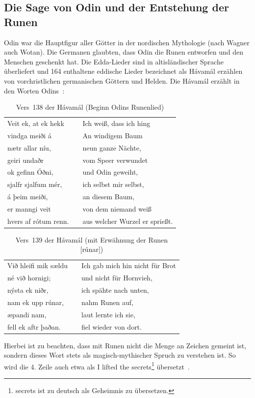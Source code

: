 \documentclass[a4paper]{scrartcl}
\begin{document}
\subsection{Die Sage von Odin und der Entstehung der Runen}
%
Odin war die Hauptfigur aller Götter in der nordischen Mythologie (nach Wagner auch \glqq Wotan\grqq). Die Germanen glaubten, dass Odin die Runen entworfen und den Menschen geschenkt hat. Die Edda-Lieder sind in altisländischer Sprache überliefert und 164 enthaltene eddische Lieder bezeichnet als Hávamál erzählen von vorchristlichen germanischen Göttern und Helden. Die Hávamál erzählt in den Worten Odins~\cite{havamal}:
%
\begin{table}[!ht]
  \begin{center}
    \begin{tabular}{lp{30pt}l}
      Veit ek, at ek hekk   && Ich weiß, dass ich hing \\
      vindga meiði á        && An windigem Baum \\
      nætr allar níu,       && neun ganze Nächte, \\
      geiri undaðr          && vom Speer verwundet \\
      ok gefinn Óðni,       && und Odin geweiht, \\
      sjalfr sjalfum mér,   && ich selbst mir selbst, \\
      á þeim meiði,         && an diesem Baum, \\
      er manngi veit        && von dem niemand weiß \\
      hvers af rótum renn.  && aus welcher Wurzel er sprießt.
    \end{tabular}
    \caption{Vers~138 der Hávamál (Beginn Odins Runenlied)}
  \end{center}
\end{table}
%
\begin{table}[!ht]
  \begin{center}
    \begin{tabular}{lp{30pt}l}
      Við hleifi mik sældu  && Ich gab mich hin nicht für Brot \\
      né við hornigi;       && und nicht für Hornvieh, \\
      nýsta ek niðr,        && ich spähte nach unten, \\
      nam ek upp rúnar,     && nahm Runen auf, \\
      æpandi nam,           && laut lernte ich sie, \\
      fell ek aftr þaðan.   && fiel wieder von dort.
    \end{tabular}
    \caption{Vers~139 der Hávamál (mit Erwähnung der Runen [rúnar])}
  \end{center}
\end{table}
%
Hierbei ist zu beachten, dass mit Runen nicht die Menge an Zeichen gemeint ist, sondern dieses Wort stets als magisch-mythischer Spruch zu verstehen ist. So wird die 4. Zeile auch etwa als {\glqq I lifted the secrets\grqq}\footnote{\glqq secrets\grqq{} ist zu deutsch als Geheimnis zu übersetzen.} übersetzt~\cite{havamal-vers-139}.
\end{document}
